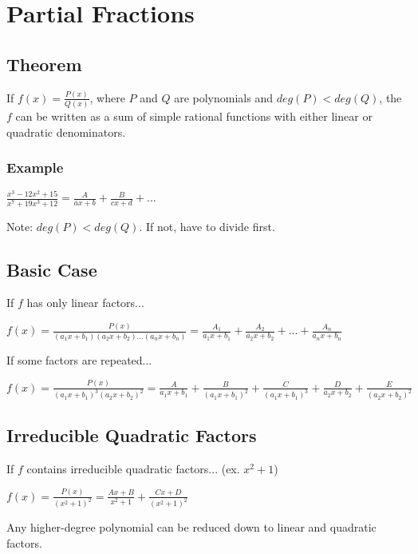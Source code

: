 \documentclass{article}
\begin{document}
\section{Partial Fractions}
\subsection{Theorem}
If $f(x) = \frac{P(x)}{Q(x)}$, where $P$ and $Q$ are polynomials and $deg(P) < deg(Q)$, the $f$ can be written as a sum of simple rational functions with either linear or quadratic denominators. 

\subsubsection{Example}
$\frac{x^3-12x^2+15}{x^7+19x^3+12} = \frac{A}{ax+b}+\frac{B}{cx+d} + ...$

Note: $deg(P) < deg(Q)$. If not, have to divide first.

\subsection{Basic Case}
If $f$ has only linear factors...

$f(x) = \frac{P(x)}{(a_1x + b_1)(a_2x + b_2)...(a_nx + b_n)} = \frac{A_1}{a_1x+b_1} + \frac{A_2}{a_2x+b_2} + ... + \frac{A_n}{a_nx+b_n}$

If some factors are repeated... 

$f(x) = \frac{P(x)}{(a_1x + b_1)^3(a_2x + b_2)^2} = \frac{A}{a_1x+b_1} + \frac{B}{(a_1x+b_1)^2} + \frac{C}{(a_1x+b_1)^3} + \frac{D}{a_2x+b_2} + \frac{E}{(a_2x+b_2)^2}$

\subsection{Irreducible Quadratic Factors}

If $f$ contains irreducible quadratic factors... (ex. $x^2+1$)

$f(x) = \frac{P(x)}{(x^2+1)^2} = \frac{Ax+B}{x^2+1} + \frac{Cx+D}{(x^2+1)^2}$

Any higher-degree polynomial can be reduced down to linear and quadratic factors.
\end{document}

